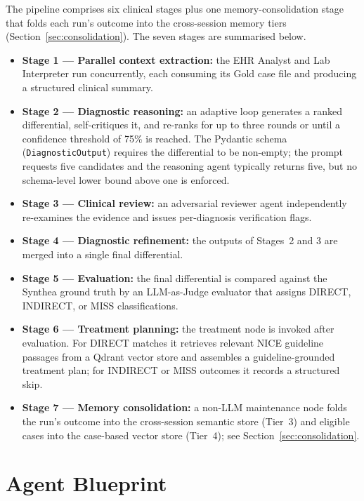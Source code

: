 The pipeline comprises six clinical stages plus one memory-consolidation
stage that folds each run's outcome into the cross-session memory tiers
(Section~\ref{sec:consolidation}). The seven stages are summarised below.
\begin{itemize}
  \item \textbf{Stage 1 --- Parallel context extraction:} the EHR Analyst and
  Lab Interpreter run concurrently, each consuming its Gold case file and
  producing a structured clinical summary.
  \item \textbf{Stage 2 --- Diagnostic reasoning:} an adaptive loop generates
  a ranked differential, self-critiques it, and re-ranks for up to three
  rounds or until a confidence threshold of 75\% is reached. The
  Pydantic schema (\texttt{DiagnosticOutput}) requires the differential
  to be non-empty; the prompt requests five candidates and the
  reasoning agent typically returns five, but no schema-level lower
  bound above one is enforced.
  \item \textbf{Stage 3 --- Clinical review:} an adversarial reviewer agent
  independently re-examines the evidence and issues per-diagnosis verification
  flags.
  \item \textbf{Stage 4 --- Diagnostic refinement:} the outputs of Stages~2
  and 3 are merged into a single final differential.
  \item \textbf{Stage 5 --- Evaluation:} the final differential is compared
  against the Synthea ground truth by an LLM-as-Judge evaluator that assigns
  DIRECT, INDIRECT, or MISS classifications.
  \item \textbf{Stage 6 --- Treatment planning:} the treatment node is invoked
  after evaluation. For DIRECT matches it retrieves relevant NICE guideline
  passages from a Qdrant vector store and assembles a guideline-grounded
  treatment plan; for INDIRECT or MISS outcomes it records a structured skip.
  \item \textbf{Stage 7 --- Memory consolidation:} a non-LLM maintenance node
  folds the run's outcome into the cross-session semantic store (Tier~3) and
  eligible cases into the case-based vector store (Tier~4); see
  Section~\ref{sec:consolidation}.
\end{itemize}

\FloatBarrier
\section{Agent Blueprint}
\label{sec:agent_blueprint}


